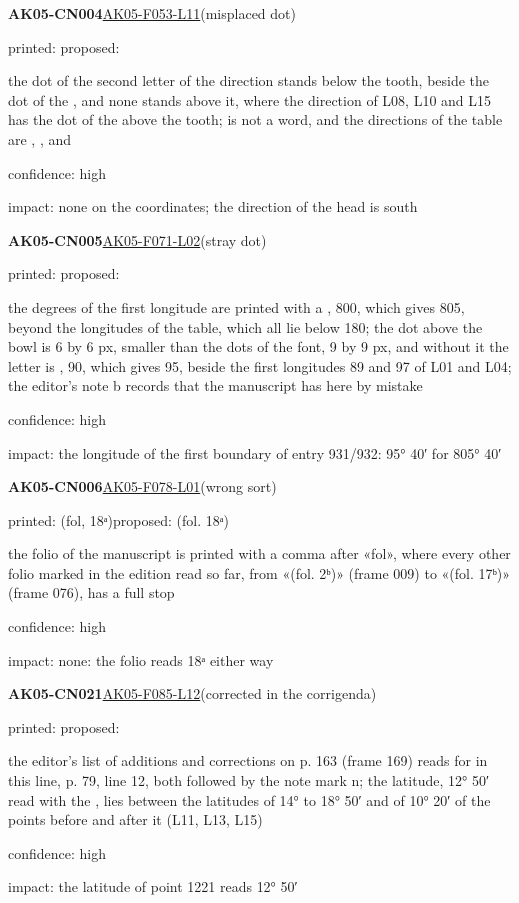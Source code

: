 \documentclass[11pt]{article}
\begin{document}
\noindent\textbf{AK05-CN004}\enspace\hyperlink{AK05-F053-L11}{AK05-F053-L11}\enspace(misplaced dot)\par\noindent printed: \enspace proposed: \par\noindent the dot of the second letter of the direction stands below the tooth, beside the dot of the , and none stands above it, where the direction  of L08, L10 and L15 has the dot of the  above the tooth;  is not a word, and the directions of the table are , ,  and \par\noindent confidence: high\par\noindent impact: none on the coordinates; the direction of the head is south\par\medskip
\noindent\textbf{AK05-CN005}\enspace\hyperlink{AK05-F071-L02}{AK05-F071-L02}\enspace(stray dot)\par\noindent printed: \enspace proposed: \par\noindent the degrees of the first longitude are printed with a , 800, which gives 805, beyond the longitudes of the table, which all lie below 180; the dot above the bowl is 6 by 6 px, smaller than the dots of the font, 9 by 9 px, and without it the letter is , 90, which gives 95, beside the first longitudes 89 and 97 of L01 and L04; the editor's note b records that the manuscript has  here by mistake\par\noindent confidence: high\par\noindent impact: the longitude of the first boundary of entry 931/932: 95° 40′ for 805° 40′\par\medskip
\noindent\textbf{AK05-CN006}\enspace\hyperlink{AK05-F078-L01}{AK05-F078-L01}\enspace(wrong sort)\par\noindent printed: (fol, 18ᵃ)\enspace proposed: (fol. 18ᵃ)\par\noindent the folio of the manuscript is printed with a comma after «fol», where every other folio marked in the edition read so far, from «(fol. 2ᵇ)» (frame 009) to «(fol. 17ᵇ)» (frame 076), has a full stop\par\noindent confidence: high\par\noindent impact: none: the folio reads 18ᵃ either way\par\medskip
\noindent\textbf{AK05-CN021}\enspace\hyperlink{AK05-F085-L12}{AK05-F085-L12}\enspace(corrected in the corrigenda)\par\noindent printed: \enspace proposed: \par\noindent the editor's list of additions and corrections on p. 163 (frame 169) reads  for  in this line, p. 79, line 12, both followed by the note mark n; the latitude, 12° 50′ read with the , lies between the latitudes of 14° to 18° 50′ and of 10° 20′ of the points before and after it (L11, L13, L15)\par\noindent confidence: high\par\noindent impact: the latitude of point 1221 reads 12° 50′\par\medskip
\end{document}
